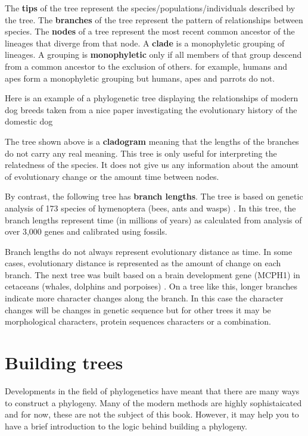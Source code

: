 \documentclass[
]{book}
\begin{document}
The \textbf{tips} of the tree represent the species/populations/individuals described by the tree. The \textbf{branches} of the tree represent the pattern of relationships between species. The \textbf{nodes} of a tree represent the most recent common ancestor of the lineages that diverge from that node. A \textbf{clade} is a monophyletic grouping of lineages. A grouping is \textbf{monophyletic} only if all members of that group descend from a common ancestor to the exclusion of others. for example, humans and apes form a monophyletic grouping but humans, apes and parrots do not.

Here is an example of a phylogenetic tree displaying the relationships of modern dog breeds taken from a nice paper investigating the evolutionary history of the domestic dog \citep{Parker17}

The tree shown above is a \textbf{cladogram} meaning that the lengths of the branches do not carry any real meaning. This tree is only useful for interpreting the relatedness of the species. It does not give us any information about the amount of evolutionary change or the amount time between nodes.

By contrast, the following tree has \textbf{branch lengths}. The tree is based on genetic analysis of 173 species of hymenoptera (bees, ants and wasps) \citep{Peters17}. In this tree, the branch lengths represent time (in millions of years) as calculated from analysis of over 3,000 genes and calibrated using fossils.

Branch lengths do not always represent evolutionary distance as time. In some cases, evolutionary distance is represented as the amount of change on each branch. The next tree was built based on a brain development gene (MCPH1) in cetaceans (whales, dolphins and porpoises) \citep{McGowen11}. On a tree like this, longer branches indicate more character changes along the branch. In this case the character changes will be changes in genetic sequence but for other trees it may be morphological characters, protein sequences characters or a combination.

\hypertarget{building-trees}{%
\section{Building trees}\label{building-trees}}

Developments in the field of phylogenetics have meant that there are many ways to construct a phylogeny. Many of the modern methods are highly sophistaicated and for now, these are not the subject of this book. However, it may help you to have a brief introduction to the logic behind building a phylogeny.
\end{document}
